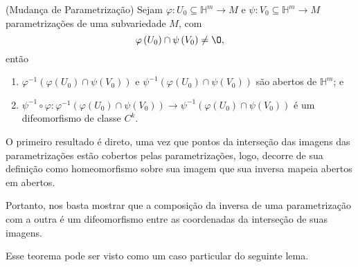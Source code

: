 \begin{theorem}
    (Mudança de Parametrização) Sejam $\varphi : U_0\subseteq\mathbb{H}^{m} \longrightarrow M$ e $\psi: V_0\subseteq\mathbb{H}^{m} \longrightarrow M$ parametrizações de uma subvariedade $M$, com \[
    \varphi \left( U_0 \right) \cap \psi\left( V_0 \right) \neq \O
    ,\] então
    \begin{enumerate}
        \item $\varphi ^{-1}\left( \varphi \left( U_0 \right) \cap \psi\left( V_0 \right)  \right)$ e $\psi ^{-1}\left( \varphi \left( U_0 \right) \cap \psi\left( V_0 \right)  \right)$ são abertos de $\mathbb{H}^{m}$; e
	\item $\psi^{-1}\circ \varphi : \varphi ^{-1}\left( \varphi \left( U_0 \right) \cap \psi\left( V_0 \right)  \right)  \longrightarrow \psi ^{-1}\left( \varphi \left( U_0 \right) \cap \psi\left( V_0 \right)  \right) $ é um difeomorfismo de classe $C^{k}$.
    \end{enumerate}
\end{theorem}

\begin{intuition}
    O primeiro resultado é direto, uma vez que pontos da interseção das imagens das parametrizações estão cobertos pelas parametrizações, logo, decorre de sua definição como homeomorfismo sobre sua imagem que sua inversa mapeia abertos em abertos.

    Portanto, nos basta mostrar que a composição da inversa de uma parametrização com a outra é um difeomorfismo entre as coordenadas da interseção de suas imagens.
\end{intuition}

Esse teorema pode ser visto como um caso particular do seguinte lema.

